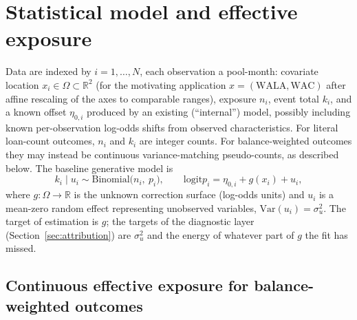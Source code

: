 \documentclass[11pt]{article}
\newcommand{\Var}{\mathrm{Var}}
\newcommand{\logit}{\mathrm{logit}}
\begin{document}
\section{Statistical model and effective exposure}\label{sec:model}

Data are indexed by $i=1,\dots,N$, each observation a pool-month:
covariate location $x_i\in\Omega\subset\mathbb{R}^2$ (for the motivating application
$x=(\text{WALA},\text{WAC})$ after affine rescaling of the axes to comparable ranges),
exposure $n_i$, event total $k_i$, and a known offset $\eta_{0,i}$ produced by an
existing (``internal'') model, possibly including known per-observation log-odds shifts
from observed characteristics. For literal loan-count outcomes, $n_i$ and $k_i$ are
integer counts. For balance-weighted outcomes they may instead be continuous
variance-matching pseudo-counts, as described below. The baseline generative model is
\begin{equation}\label{eq:model}
k_i \mid u_i \sim \mathrm{Binomial}\bigl(n_i,\ p_i\bigr),\qquad
\logit p_i = \eta_{0,i} + g(x_i) + u_i,
\end{equation}
where $g:\Omega\to\mathbb{R}$ is the unknown correction surface (log-odds units) and
$u_i$ is a mean-zero random effect representing unobserved variables,
$\Var(u_i)=\sigma_u^2$. The target of estimation is $g$; the targets of the diagnostic
layer (Section~\ref{sec:attribution}) are $\sigma_u^2$ and the energy of whatever part of $g$
the fit has missed.

\subsection{Continuous effective exposure for balance-weighted outcomes}
\label{sec:wacls}
\end{document}
